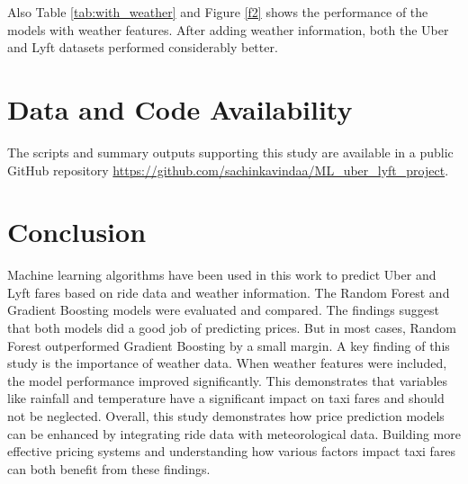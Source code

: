 \documentclass[letterpaper, 10 pt, conference]{ieeeconf}  %
\begin{document}
Also Table \ref{tab:with_weather} and Figure \ref{f2} shows the performance of the models with weather features. After adding weather information, both the Uber and Lyft datasets performed considerably better. 

\section{Data and Code Availability}

The scripts and summary outputs supporting this study are available in a public GitHub repository \url{https://github.com/sachinkavindaa/ML_uber_lyft_project}. 

\section{Conclusion}

Machine learning algorithms have been used in this work to predict Uber and Lyft fares based on ride data and weather information. The Random Forest and Gradient Boosting models were evaluated and compared. The findings suggest that both models did a good job of predicting prices. But in most cases, Random Forest outperformed Gradient Boosting by a small margin. A key finding of this study is the importance of weather data. When weather features were included, the model performance improved significantly. This demonstrates that variables like rainfall and temperature have a significant impact on taxi fares and should not be neglected. Overall, this study demonstrates how price prediction models can be enhanced by integrating ride data with meteorological data. Building more effective pricing systems and understanding how various factors impact taxi fares can both benefit from these findings.
\end{document}
